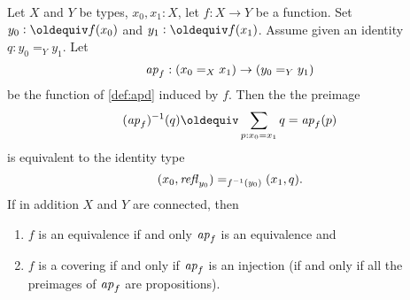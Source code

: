 \begin{lemma}
  \label{lem:eqandcovofconntypes}
  Let $X$ and $Y$ be types, $x_0,x_1:X$, let $f:X\to Y$ be a function.  Set $y_0\defequi f(x_0)$ and $y_1\defequi f(x_1)$. Assume given an identity $q:y_0=_Yy_1$. Let 
    $$%
\ap f:(x_0=_Xx_1)\to (y_0=_Yy_1)$$
be the function of \cref{def:apd} induced by $f$.  Then the  the preimage 
$$(\ap f)^{-1}(q)\oldequiv\sum_{p:x_0=x_1}q=\ap f(p)$$ is equivalent to the identity type 
 $$(x_0,\mathop{{\it refl}_{y_0}})=_{f^{-1}(y_0)}(x_1,q).$$ 
If in addition $X$ and $Y$ are connected, then
\begin{enumerate}
\item $f$ is an equivalence if and only $\ap f%
$ is an equivalence and
\item $f$ is a covering if and only if  $\ap f%
$ is an injection (\ie if and only if all the preimages of $\mathop{{\it ap}_{f}}$ are propositions).
\end{enumerate}

\end{lemma}
